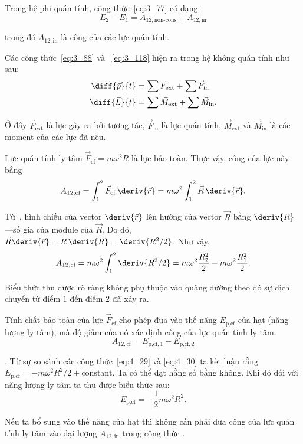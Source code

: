 Trong hệ phi quán tính, công thức~\eqref{eq:3_77} có dạng:
\begin{equation}\label{eq:4_26}
E_2-E_1 = A_{12,\text{non-cons}} + A_{12,\text{in}}
\end{equation}

\noindent
trong đó $A_{12,\text{in}}$ là công của các lực quán tính.

Các công thức~\eqref{eq:3_88} và ~\eqref{eq:3_118} hiện ra trong hệ không quán tính như sau:
\begin{align}
\diff{\vec{p}}{t} &= \sum\vec{F}_{\text{ext}} + \sum\vec{F}_{\text{in}}\label{eq:4_27}\\
\diff{\vec{L}}{t} &= \sum\vec{M}_{\text{ext}} + \sum\vec{M}_{\text{in}}\label{eq:4_28}.
\end{align}

Ở đây $\vec{F}_{\text{ext}}$ là lực gây ra bởi tương tác, $\vec{F}_{\text{in}}$ là lực quán tính, $\vec{M}_{\text{ext}}$ và $\vec{M}_{\text{in}}$ là các moment của các lực đã nêu.

Lực quán tính ly tâm $\vec{F}_{\text{cf}}=m\omega^2 R$ là lực bảo toàn. Thực vậy, công của lực này bằng
\begin{equation*}
A_{12,\text{cf}} = \int_1^2\vec{F}_{\text{cf}}\,\deriv{\vec{r}} = m\omega^2\int_{1}^{2}\vec{R}\,\deriv{\vec{r}}.
\end{equation*}

\noindent
Từ~, hình chiếu của vector $\deriv{\vec{r}}$ lên hướng của vector $\vec{R}$ bằng $\deriv{R}$---số gia của module của $\vec{R}$. Do đó, $\vec{R}\deriv{\vec{r}}=R\,\deriv{R} = \deriv{R^2/2}$. Như vậy,
\begin{equation}\label{eq:4_29}
A_{12,\text{cf}} = m\omega^2 \int_{1}^{2} \deriv{R^2/2} = m\omega^2 \frac{R^2_2}{2} - m\omega^2 \frac{R^2_1}{2}.
\end{equation}

\noindent
Biểu thức thu được rõ ràng không phụ thuộc vào quãng đường theo đó sự dịch chuyển từ điểm $1$ đến điểm $2$ đã xảy ra.

Tính chất bảo toàn của lực $\vec{F}_{\text{cf}}$ cho phép đưa vào thế năng $E_{\text{p,cf}}$ của hạt (năng lượng ly tâm), mà độ giảm của nó xác định công của lực quán tính ly tâm:
\begin{equation}\label{eq:4_30}
A_{12,\text{cf}} = E_{\text{p,cf},1} - E_{\text{p,cf},2}
\end{equation}

. Từ sự so sánh các công thức~\eqref{eq:4_29} và \eqref{eq:4_30} ta kết luận rằng $E_{\text{p,cf}}=-m\omega^2R^2/2 + \text{constant}$. Ta có thể đặt hằng số bằng không. Khi đó đối với năng lượng ly tâm ta thu được biểu thức sau:
\begin{equation}\label{eq:4_31}
E_{\text{p,cf}} = -\frac{1}{2} m \omega^2 R^2.
\end{equation}

Nếu ta bổ sung  vào thế năng của hạt thì không cần phải đưa công của lực quán tính ly tâm vào đại lượng $A_{12,\text{in}}$ trong công thức .